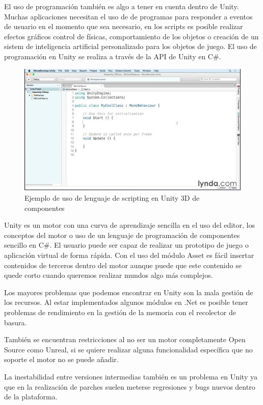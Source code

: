 \documentclass[a4paper, 17pt]{book}
\begin{document}
El uso de programación también es algo a tener en cuenta dentro de Unity. Muchas aplicaciones necesitan el uso
de de programas para responder a eventos de usuario en el momento que sea necesario, en los scripts es posible
realizar efectos gráficos control de físicas, comportamiento de los objetos o creación de un sistem de inteligencia
artificial personalizado para los objetos de juego. El uso de programación en Unity se realiza a través de la
API de Unity en C\#.

\begin{figure}[hbt!]
    \centering
    \includegraphics[scale=0.60, keepaspectratio]{img/APIUnity.jpg}
    \caption{Ejemplo de uso de lenguaje de scripting en Unity 3D de componentes}
    \label{figura:APIUnity}
\end{figure}

Unity es un motor con una curva de aprendizaje sencilla en el uso del editor, los conceptos del motor o uso de un
lenguaje de programación de componentes sencillo en C\#. El usuario puede ser capaz de realizar un prototipo de
juego o aplicación virtual de forma rápida. Con el uso del módulo Asset es fácil insertar contenidos de terceros
dentro del motor aunque puede que este contenido se quede corto cuando queremos realizar mundos algo más complejos. 

Los mayores problemas que podemos encontrar en Unity son la mala gestión de los recursos. Al estar implementados
algunos módulos en .Net es posible tener problemas de rendimiento en la gestión de la memoria con el recolector de basura. 

También se encuentran restricciones al no ser un motor completamente Open Source como Unreal, si se quiere realizar
alguna funcionalidad específica que no soporte el motor no se puede añadir.

La inestabilidad entre versiones intermedias también es un problema en Unity ya que en la realización de parches suelen
meterse regresiones y bugs nuevos dentro de la plataforma.
\end{document}
